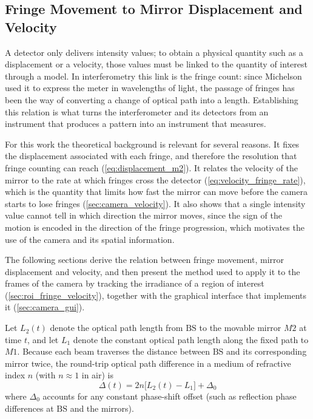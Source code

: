 \subsection{Fringe Movement to Mirror Displacement and Velocity}
\label{sec:fringe_to_displacement_velocity}

A detector only delivers intensity values; to obtain a physical quantity such as a displacement or a velocity, those values must be linked to the quantity of interest through a model. In interferometry this link is the fringe count: since Michelson used it to express the meter in wavelengths of light, the passage of fringes has been the way of converting a change of optical path into a length. Establishing this relation is what turns the interferometer and its detectors from an instrument that produces a pattern into an instrument that measures.

For this work the theoretical background is relevant for several reasons. It fixes the displacement associated with each fringe, and     therefore the resolution that fringe counting can reach (\cref{eq:displacement_m2}). It relates the velocity of the mirror to the rate at which fringes cross the detector (\cref{eq:velocity_fringe_rate}), which is the quantity that limits how fast the mirror can move before the camera starts to lose fringes (\cref{sec:camera_velocity}). It also shows that a single intensity value cannot tell in which direction the mirror moves, since the sign of the motion is encoded in the direction of the fringe progression, which motivates the use of the camera and its spatial information.

The following sections derive the relation between fringe movement, mirror displacement and velocity, and then present the method used to apply it to the frames of the camera by tracking the irradiance of a region of interest (\cref{sec:roi_fringe_velocity}), together with the graphical interface that implements it (\cref{sec:camera_gui}).

Let $L_2(t)$ denote the optical path length from $\text{BS}$ to the movable mirror $M2$ at time $t$, and let $L_1$ denote the constant optical path length along the fixed path to $M1$. Because each beam traverses the distance between $\text{BS}$ and its corresponding mirror twice, the round-trip optical path difference in a medium of refractive index $n$ (with $n \approx 1$ in air) is
\begin{equation}
    \Delta(t) = 2n\bigl[L_2(t) - L_1\bigr] + \Delta_0
    \label{eq:opd_m2}
\end{equation}
where $\Delta_0$ accounts for any constant phase-shift offset (such as reflection phase differences at $\text{BS}$ and the mirrors).

